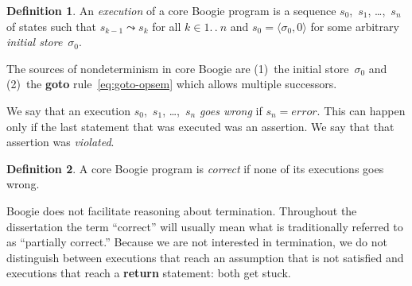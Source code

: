 \documentclass[a4paper]{article}
\theoremstyle{slanted}
\theoremstyle{definition}
\newtheorem{definition}{Definition}
\theoremstyle{remark}
\begin{document}
\begin{definition}
An \emph{execution} of a core Boogie program is a sequence
$s_0$,~$s_1$, \dots,~$s_n$ of states such that $s_{k-1}\leadsto
s_k$ for all $k\in1.\,.\>n$ and $s_0=\langle\sigma_0,0\rangle$
for some arbitrary \emph{initial store}~$\sigma_0$.
\label{def:execution}
\end{definition}

The sources of nondeterminism in core Boogie are (1)~the
initial store~$\sigma_0$ and (2)~the \textbf{goto}
rule~\eqref{eq:goto-opsem} which allows multiple successors.

We say that an execution $s_0$,~$s_1$, \dots,~$s_n$ \emph{goes
wrong} if $s_n=\mathit{error}$. This can happen only if the last
statement that was executed was an assertion. We say that that
assertion was \emph{violated}.

\begin{definition}
A core Boogie program is \emph{correct} if none of its executions
goes wrong.
\label{def:correctness}
\end{definition}

Boogie does not facilitate reasoning about termination.
Throughout the dissertation the term ``correct'' will usually
mean what is traditionally referred to as ``partially correct.''
Because we are not interested in termination, we do not
distinguish between executions that reach an assumption that
is not satisfied and executions that reach a \textbf{return}
statement: both get stuck.
\end{document}

